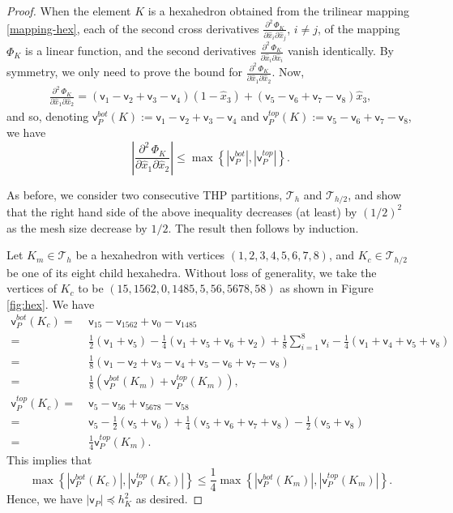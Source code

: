 \documentclass[twoside,reqno,final]{amsart}
\newcommand{\vt}{\mathsf{v}}
\begin{document}
\begin{proof}
When the element $K$ is a hexahedron obtained from the trilinear mapping \eqref{mapping-hex}, 
each of the second cross derivatives $\frac{\partial^2\, \Phi_K}{\partial \hat x_i\partial \hat x_j}$, $i\not=j$,  of the mapping $\Phi_K$ is a linear function, 
and the second derivatives $\frac{\partial^2\, \Phi_K}{\partial \hat x_i\partial \hat x_i}$ vanish identically.
By symmetry, we only need to prove the bound for 
$\frac{\partial^2\, \Phi_K}{\partial \hat x_1\partial \hat x_2}$. 
Now, 
\begin{align*}
 \frac{\partial^2\, \Phi_K}{\partial \hat x_1\partial \hat x_2}
 = (\vt_1-\vt_2+\vt_3-\vt_4)(1-\widehat x_3)
 +(\vt_5-\vt_6+\vt_7-\vt_8)\widehat x_3,
\end{align*}
and so, 
denoting $\vt_P^{bot}(K) := \vt_1-\vt_2+\vt_3-\vt_4$ 
and $\vt_P^{top}(K) := \vt_5-\vt_6+\vt_7-\vt_8$, we have 
\[
\left| \frac{\partial^2\, \Phi_K}{\partial \hat x_1\partial \hat x_2}
\right|\le \max\left\{|\vt_P^{bot}|, |\vt_P^{top}|\right\}.
\]

As before, we consider two consecutive {\sf THP} partitions, $\mathcal{T}_h$ and $\mathcal{T}_{h/2}$, and 
show that the right hand side of the above inequality decreases (at least) by 
$(1/2)^2$ as the mesh size decrease by $1/2$. The result then follows by induction.

Let $K_{m}\in \mathcal{T}_h$ be a hexahedron with vertices $(1,2,3,4,5,6,7,8)$, and 
$K_{c}\in \mathcal{T}_{h/2}$ be one of its eight child hexahedra.
Without loss of generality, we take the vertices of $K_{c}$ to be 
$
 (15, 1562,0,1485,5, 56,5678,58)$
as shown in Figure \ref{fig:hex}.
We have 
\begin{align*}
  \vt_P^{bot}(K_c) = &\;
  \vt_{15} - \vt_{1562} + 
 \vt_{0}-\vt_{1485}\\
 = &\;\frac12(\vt_{1}+\vt_5)-
 \frac{1}{4}(\vt_{1}+\vt_{5}+\vt_6+\vt_2)  +
 \frac{1}{8}\sum_{i=1}^8\vt_{i}
 - \frac14(\vt_{1}+\vt_{4}+\vt_5+\vt_8)\\
 = &\;\frac{1}{8}(\vt_{1}-\vt_{2}+\vt_3-\vt_4
 +\vt_{5}-\vt_{6}+\vt_7-\vt_8)\\
 = &\;\frac{1}{8}\left(\vt_P^{bot}(K_m)+\vt_P^{top}(K_m)\right),\\
  \vt_P^{top}(K_c) = &\;
  \vt_{5} - \vt_{56} + 
 \vt_{5678}-\vt_{58}\\
 = &\;\vt_5-
 \frac{1}{2}(\vt_{5}+\vt_6)  +
 \frac14(\vt_{5}+\vt_{6}+\vt_7+\vt_8) - \frac12(\vt_{5}+\vt_8)\\
 = &\;\frac{1}{4}\vt_P^{top}(K_m).
\end{align*}
This implies that
\[
 \max\left\{|\vt_P^{bot}(K_c)|, |\vt_P^{top}(K_c)|\right\}\le 
  \frac14\max\left\{|\vt_P^{bot}(K_m)|, |\vt_P^{top}(K_m)|\right\}.
\]
Hence, we have $|\vt_P|\preceq h_K^2$ as desired.
\end{proof}
\end{document}
